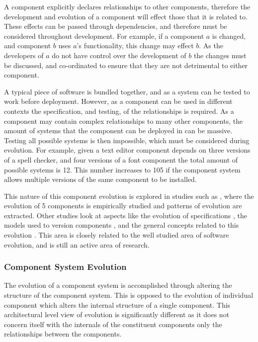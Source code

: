 A component explicitly declares relationships to other components, therefore the development and evolution of a component will effect those that it is related to.
These effects can be passed through dependencies, and therefore must be considered throughout development.
For example, if a component $a$ is changed, and component $b$ uses $a$'s functionality, this change may effect $b$.
As the developers of $a$ do not have control over the development of $b$ the changes must be discussed, and co-ordinated to ensure that they are not detrimental to either component.

A typical piece of software is bundled together, and as a system can be tested to work before deployment.
However, as a component can be used in different contexts the specification, and testing, of the relationships is required.
As a component may contain complex relationships to many other components,
the amount of systems that the component can be deployed in can be massive.
Testing all possible systems is then impossible, which must be considered during evolution.
For example, given a text editor component depends on three versions of a spell checker, 
and four versions of a font component the total amount of possible systems is 12.
This number increases to 105 if the component system allows multiple versions of the same component to be installed.

This nature of this component evolution is explored in studies such as \cite{vasa2007patterns}, where the evolution of 5 components is empirically studied and patterns of evolution are extracted.
Other studies look at aspects like the evolution of specifications \cite{Mencl2001}, the models used to version components \cite{Stuckenholz2005},
and the general concepts related to this evolution \cite{Rhode2000}.
This area is closely related to the well studied area of software evolution, and is still an active area of research.

\subsubsection{Component System Evolution}
The evolution of a component system is accomplished through altering the structure of the component system.
This is opposed to the evolution of individual component which alters the internal structure of a single component.
This architectural level view of evolution is significantly different as it does not concern itself with the internals of the constituent components only the relationships between the components.

